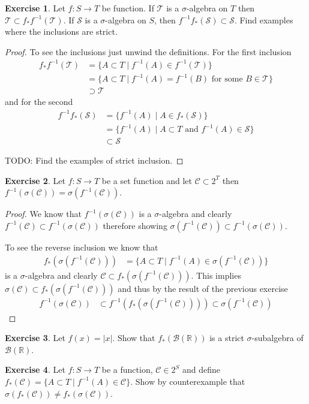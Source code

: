 \documentclass{amsbook}
\theoremstyle{definition}
\newtheorem{xca}{Exercise}
\theoremstyle{remark}
\newcommand{\reals}{\mathbb{R}}
\newcommand{\abs}[1]{\left \vert #1 \right \vert}
\begin{document}
\begin{xca}Let $f : S \to T$ be function.  If $\mathcal{T}$ is a
  $\sigma$-algebra on $T$ then $\mathcal{T} \subset f_*
  f^{-1}(\mathcal{T})$.  If $\mathcal{S}$ is a $\sigma$-algebra on
  $S$, then $f^{-1}f_*(\mathcal{S}) \subset \mathcal{S}$.  Find examples where the inclusions are strict.
\end{xca}
\begin{proof}
To see the inclusions just unwind the definitions.  For the first inclusion
\begin{align*}
f_* f^{-1}(\mathcal{T}) &= \lbrace A \subset T \mid f^{-1}(A) \in
f^{-1}(\mathcal{T}) \rbrace \\
&= \lbrace A \subset T \mid f^{-1}(A) =
f^{-1}(B) \text { for some } B \in \mathcal{T} \rbrace \\
&\supset \mathcal{T}
\end{align*}
and for the second
\begin{align*}
f^{-1} f_* (\mathcal{S}) &= \lbrace f^{-1}(A) \mid A \in  f_*
(\mathcal{S}) \rbrace \\
&= \lbrace f^{-1}(A) \mid A \subset T \text{ and } f^{-1}(A) \in
\mathcal{S} \rbrace \\
&\subset \mathcal{S}
\end{align*}

TODO: Find the examples of strict inclusion.
\end{proof}
\begin{xca}Let $f : S \to T$ be a set function and let $\mathcal{C}
  \subset 2^T$ then $f^{-1}(\sigma(\mathcal{C})) = \sigma(f^{-1}(\mathcal{C}))$.
\end{xca}
\begin{proof}
We know that $f^{-1}(\sigma(\mathcal{C}))$ is a $\sigma$-algebra and
clearly $f^{-1}(\mathcal{C}) \subset f^{-1}(\sigma(\mathcal{C}))$
therefore showing $\sigma(f^{-1}(\mathcal{C})) \subset
f^{-1}(\sigma(\mathcal{C}))$.  

To see the reverse inclusion we know that 
\begin{align*}
f_* (\sigma(f^{-1}(\mathcal{C}))) &= \lbrace A \subset T \mid
f^{-1}(A) \in \sigma(f^{-1}(\mathcal{C})) \rbrace
\end{align*}
is a $\sigma$-algebra and clearly $\mathcal{C} \subset f_*
(\sigma(f^{-1}(\mathcal{C})))$.  This implies $\sigma(\mathcal{C}) \subset f_*
(\sigma(f^{-1}(\mathcal{C})))$ and thus by the result of the previous
exercise
\begin{align*}
f^{-1}(\sigma(\mathcal{C})) &\subset 
f^{-1} (f_*(\sigma(f^{-1}(\mathcal{C})))) \subset \sigma(f^{-1}(\mathcal{C}))
\end{align*}
\end{proof}
\begin{xca}Let $f(x) = \abs{x}$.  Show that $f_*(\mathcal{B}(\reals))$
  is a strict $\sigma$-subalgebra of $\mathcal{B}(\reals)$.
\end{xca}
\begin{xca}Let $f : S \to T$ be a function, $\mathcal{C} \in
  2^S$ and define $f_*(\mathcal{C}) =  \{A \subset T \mid
    f^{-1}(A) \in \mathcal{C} \}$.  Show by counterexample that
    $\sigma(f_*(\mathcal{C})) \neq f_*(\sigma(\mathcal{C}))$.
\end{xca}
\end{document}
